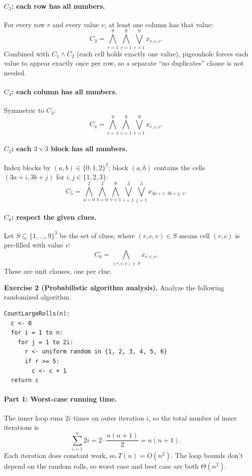 \documentclass{article}
\theoremstyle{theorem}
\theoremstyle{definition}
\theoremstyle{remark}
\begin{document}
\paragraph{$C_3$: each row has all numbers.}
For every row $r$ and every value $v$, at least one column has that value:
\[
  C_3 = \bigwedge_{r=1}^{9} \bigwedge_{v=1}^{9} \bigvee_{c=1}^{9} x_{r,c,v}.
\]
Combined with $C_1 \land C_2$ (each cell holds exactly one value), pigeonhole forces each value to appear exactly once per row, so a separate ``no duplicates'' clause is not needed.

\paragraph{$C_4$: each column has all numbers.}
Symmetric to $C_3$:
\[
  C_4 = \bigwedge_{c=1}^{9} \bigwedge_{v=1}^{9} \bigvee_{r=1}^{9} x_{r,c,v}.
\]

\paragraph{$C_5$: each $3 \times 3$ block has all numbers.}
Index blocks by $(a, b) \in \{0, 1, 2\}^2$; block $(a, b)$ contains the cells $(3a + i, 3b + j)$ for $i, j \in \{1, 2, 3\}$:
\[
  C_5 = \bigwedge_{a=0}^{2} \bigwedge_{b=0}^{2} \bigwedge_{v=1}^{9} \bigvee_{i=1}^{3} \bigvee_{j=1}^{3} x_{3a+i,\, 3b+j,\, v}.
\]

\paragraph{$C_6$: respect the given clues.}
Let $S \subseteq \{1, \ldots, 9\}^3$ be the set of clues, where $(r, c, v) \in S$ means cell $(r, c)$ is pre-filled with value $v$:
\[
  C_6 = \bigwedge_{(r, c, v) \in S} x_{r,c,v}.
\]
These are unit clauses, one per clue.

\bigskip

\textbf{Exercise 2 (Probabilistic algorithm analysis).}
Analyze the following randomized algorithm.

\begin{verbatim}
CountLargeRolls(n):
  c <- 0
  for i = 1 to n:
    for j = 1 to 2i:
      r <- uniform random in {1, 2, 3, 4, 5, 6}
      if r >= 5:
        c <- c + 1
  return c
\end{verbatim}

\paragraph{Part 1: Worst-case running time.}
The inner loop runs $2i$ times on outer iteration $i$, so the total number of inner iterations is
\[
  \sum_{i=1}^{n} 2i = 2 \cdot \frac{n(n+1)}{2} = n(n+1).
\]
Each iteration does constant work, so $T(n) = O(n^2)$. The loop bounds don't depend on the random rolls, so worst case and best case are both $\Theta(n^2)$.
\end{document}
